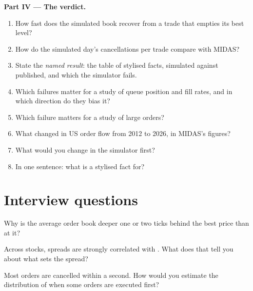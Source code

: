 \begin{problem}
\medskip\noindent\textbf{Part IV --- The verdict.}
\begin{enumerate}[resume]
\item How fast does the simulated book recover from a trade that empties its best level?
\item How do the simulated day's cancellations per trade compare with MIDAS?
\item State the \emph{named result}: the table of stylised facts, simulated against published, and which the simulator fails.
\item Which failures matter for a study of queue position and fill rates, and in which direction do they bias it?
\item Which failure matters for a study of large orders?
\item What changed in US order flow from 2012 to 2026, in MIDAS's figures?
\item What would you change in the simulator first?
\item In one sentence: what is a stylised fact for?
\end{enumerate}
\end{problem}

\section{Interview questions}

\begin{interviewq}\label{iq:mx:empirical-facts-of-order-books:1}
Why is the average order book deeper one or two ticks behind the best price than at it?
\end{interviewq}

\begin{interviewq}\label{iq:mx:empirical-facts-of-order-books:2}
Across stocks, spreads are strongly correlated with . What does that tell you about what sets the spread?
\end{interviewq}

\begin{interviewq}\label{iq:mx:empirical-facts-of-order-books:3}
Most orders are cancelled within a second. How would you estimate the distribution of  when some orders are executed first?
\end{interviewq}

